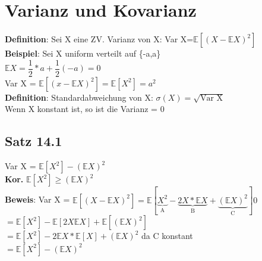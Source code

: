\chapter{Varianz und Kovarianz}
\textbf{Definition}: Sei X eine ZV. Varianz von X: \hspace{1cm} Var X=$\mathds{E}[(X-\mathds{E}X)^2]$\medskip\\
\textbf{Beispiel}: 
Sei X uniform verteilt auf \{-a,a\}\smallskip\\
$\mathds{E}X=\dfrac{1}{2}*a+\dfrac{1}{2}(-a)=0$\smallskip\\
Var X = $\mathds{E}[(x-\mathds{E}X)^2]=\mathds{E}[X^2]=a^2$\medskip\\
\textbf{Definition}: Standardabweichung von X: $\sigma(X)=\sqrt{\text{Var X}}$\medskip\\
Wenn X konstant ist, so ist die Varianz = 0
\section{Satz 14.1} Var X = $\mathds{E}[X^2]-(\mathds{E}X)^2$\medskip\\
\textbf{Kor.} $\mathds{E}[X^2] \geq (\mathds{E}X)^2$\medskip\\
\textbf{Beweis}: Var X = $\mathds{E}[(X-\mathds{E}X)^2] = \mathds{E}[\underbrace{X^2}_\text{A}-\underbrace{2X*\mathds{E}X}_\text{B}+\underbrace{(\mathds{E}X)^2}_\text{C}]0$\smallskip\\
$=\mathds{E}[X^2]-\mathds{E}[2X\mathds{E}X]+\mathds{E}[(\mathds{E}X)^2]$\smallskip\\
$=\mathds{E}[X^2]-2 \mathds{E}X*\mathds{E}[X]+(\mathds{E}X)^2$ da C konstant\smallskip\\
$=\mathds{E}[X^2]-(\mathds{E}X)^2$
